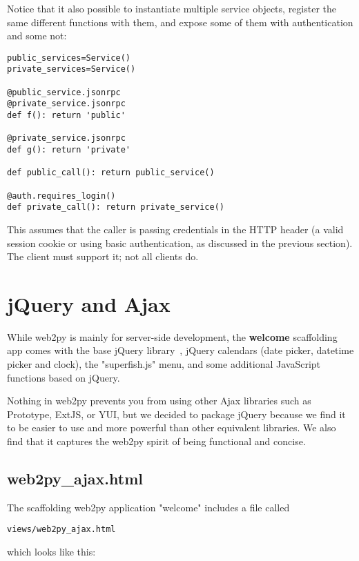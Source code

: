 \documentclass[justified,sixbynine,notoc]{tufte-book}
\def\inxx#1{\index{#1}}
\begin{document}
\begin{fullwidth}
Notice that it also possible to instantiate multiple service objects, register the same different functions with them, and expose some of them with authentication and some not:
\begin{lstlisting}
public_services=Service()
private_services=Service()

@public_service.jsonrpc
@private_service.jsonrpc
def f(): return 'public'

@private_service.jsonrpc
def g(): return 'private'

def public_call(): return public_service()

@auth.requires_login()
def private_call(): return private_service()
\end{lstlisting}

This assumes that the caller is passing credentials in the HTTP header (a valid session cookie or using basic authentication, as discussed in the previous section). The client must support it; not all clients do.

\goodbreak\chapter{jQuery and Ajax}

\inxx{Ajax}

While web2py is mainly for server-side development, the {\bf welcome} scaffolding app comes with the base jQuery library~\cite{jquery}, jQuery calendars (date picker, datetime picker and clock), the "superfish.js" menu, and some additional JavaScript functions based on jQuery.

Nothing in web2py prevents you from using other
Ajax libraries such as Prototype, ExtJS, or YUI, but we decided to package jQuery because we find it to be easier to use and more powerful than other equivalent libraries. We also find that it captures the web2py spirit of being functional and concise.

\goodbreak\section{web2py\_ajax.html}

The scaffolding web2py application "welcome" includes a file called
\begin{lstlisting}
views/web2py_ajax.html
\end{lstlisting}
\noindent which looks like this:


\end{fullwidth}
\end{document}
